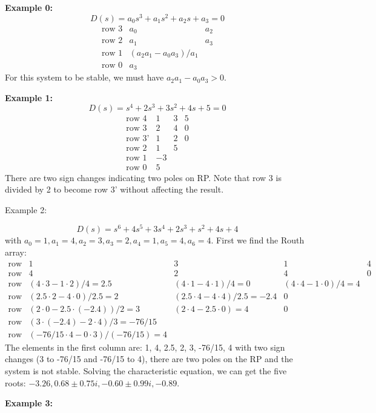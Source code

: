 \documentclass[12pt]{article}
\begin{document}
{\bf Example 0: }
\[ D(s)=a_0s^3+a_1s^2+a_2s+a_3=0 \]
\[ \begin{array}{rrr}
\mbox{row 3} & a_0 & a_2 \\
\mbox{row 2} & a_1 & a_3 \\
\mbox{row 1} & (a_2a_1-a_0a_3)/a_1 & \\
\mbox{row 0} & a_3 & 
\end{array} \]
For this system to be stable, we must have $a_2a_1-a_0a_3>0$. 

{\bf Example 1: }
\[ D(s)=s^4+2s^3+3s^2+4s+5=0 \]
\[ \begin{array}{rrrr}
\mbox{row 4}  & 1 & 3 & 5 \\
\mbox{row 3}  & 2 & 4 & 0 \\
\mbox{row 3'} & 1 & 2 & 0 \\
\mbox{row 2}  & 1 & 5 &   \\
\mbox{row 1}  & -3 &  &   \\
\mbox{row 0}  & 5  &  &   
\end{array} \]
There are two sign changes indicating two poles on RP. Note that row 3 is divided
by 2 to become row 3' without affecting the result.

{ Example 2: }

\[ D(s)=s^6+4s^5+3s^4+2s^3+s^2+4s+4 \]
with $a_0=1, a_1=4, a_2=3, a_3=2, a_4=1, a_5=4, a_6=4$. First we find the Routh 
array:
\[ \begin{array}{rrrrr}
\mbox{row 6} & 1 & 3 & 1 & 4 \\
\mbox{row 5} & 4 & 2 & 4 & 0 \\
\mbox{row 4} & (4\cdot 3-1\cdot 2)/4=2.5 & (4\cdot 1-4\cdot 1)/4=0 & (4\cdot 4-1\cdot 0)/4=4 & \\
\mbox{row 3} & (2.5\cdot 2-4\cdot 0)/2.5=2 & (2.5\cdot 4-4\cdot 4)/2.5=-2.4 & 0 & \\
\mbox{row 2} & (2\cdot 0-2.5\cdot (-2.4))/2=3 & (2\cdot 4-2.5\cdot 0)=4 & 0 & \\
\mbox{row 1} & (3\cdot (-2.4)-2\cdot 4)/3=-76/15 &  &  & \\
\mbox{row 0} & (-76/15\cdot 4-0\cdot 3)/(-76/15)=4 &  &  & 
\end{array} \]
The elements in the first column are: 1, 4, 2.5, 2, 3, -76/15, 4 with two sign 
changes (3 to -76/15 and -76/15 to 4), there are two poles on the RP and the
system is not stable. Solving the characteristic equation, we can get the five
roots: $-3.26, 0.68\pm 0.75i, -0.60\pm 0.99i,-0.89$.

{\bf Example 3:}
\end{document}
